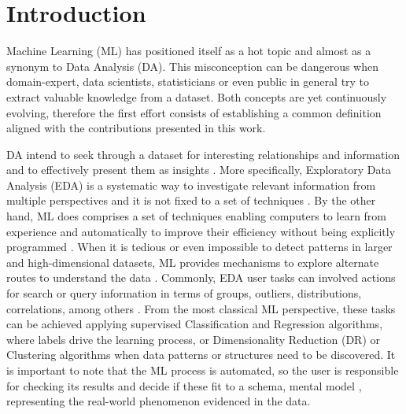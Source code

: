 
\chapter{Introduction}  %
\label{chapter1}

\graphicspath{{Chapter1/figs/}}

Machine Learning (ML) has positioned itself as a hot topic and almost as a synonym to Data Analysis (DA). This misconception can be dangerous when domain-expert, data scientists, statisticians or even public in general try to extract valuable knowledge from a dataset. Both concepts are yet continuously evolving, therefore the first effort consists of establishing a common definition aligned with the contributions presented in this work. 

DA intend to seek through a dataset for interesting relationships and information and to effectively present them as insights \cite{TukeyJohnW.andWilk1966DataOverview}. More specifically, Exploratory Data Analysis (EDA) is a systematic way to investigate relevant information from multiple perspectives and it is not fixed to a set of techniques \cite{Yu2003ExploratoryAnalysis}. By the other hand, ML does comprises a set of techniques enabling computers to learn from experience and automatically to improve their efficiency \cite{Michie1968MemoLearning} without being explicitly programmed \cite{Koza1996}. When it is tedious or even impossible to detect patterns in larger and high-dimensional datasets, ML provides mechanisms to explore alternate routes to understand the data \cite{Yu2003ExploratoryAnalysis}. Commonly, EDA user tasks can involved actions for search or query information in terms of groups, outliers, distributions, correlations, among others \cite{Munzner2014VisualizationDesign}. From the most classical ML perspective, these tasks can be achieved applying supervised Classification and Regression algorithms, where labels drive the learning process, or Dimensionality Reduction (DR) or Clustering algorithms when data patterns or structures need to be discovered. It is important to note that the ML process is automated, so the user is responsible for checking its results and decide if these fit to a schema, mental model \cite{Grolemund2014AAnalysis}, representing the real-world phenomenon evidenced in the data.

